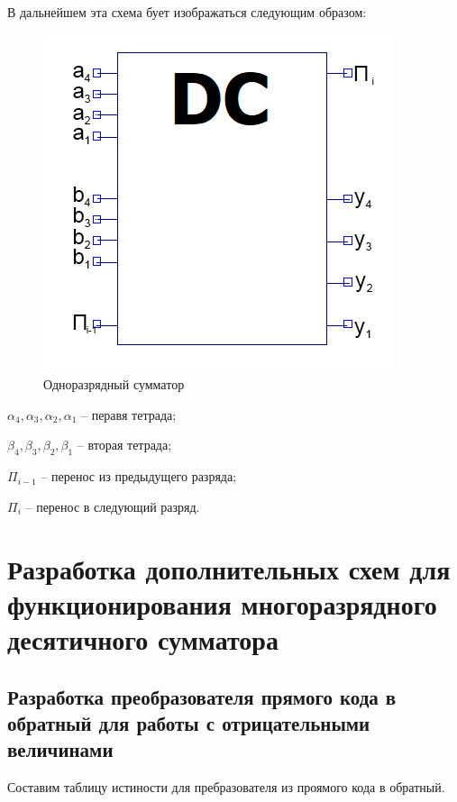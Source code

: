 \documentclass[a4paper,14pt]{article}
\begin{document}

В дальнейшем эта схема бует изображаться следующим образом:

\begin{figure}[H]
	\centering
	\includegraphics[width=0.4\linewidth]{images/odnSum_el}
	\caption{Одноразрядный сумматор}
	\label{fig:odnSum_el}
\end{figure}

$\alpha_4, \alpha_3, \alpha_2, \alpha_1$ -- перавя тетрада;

$\beta_4, \beta_3, \beta_2, \beta_1$ -- вторая тетрада;

$\Pi_{i-1}$ -- перенос из предыдущего разряда;

$\Pi_i$ -- перенос в следующий разряд.

\section{Разработка дополнительных схем для функционирования многоразрядного десятичного сумматора}

\subsection{Разработка преобразователя прямого кода в обратный для работы с отрицательными величинами}

Составим таблицу истиности для пребразователя из проямого кода в обратный.
\end{document}
